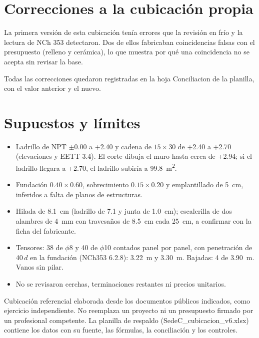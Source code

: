 \documentclass[letterpaper,10pt]{article}
\begin{document}
\section{Correcciones a la cubicación propia}
\begin{juntos}
La primera versión de esta cubicación tenía errores que la revisión en frío y la lectura de NCh 353 detectaron. Dos de ellos fabricaban coincidencias falsas con el presupuesto (relleno y cerámica), lo que muestra por qué una coincidencia no se acepta sin revisar la base.

Todas las correcciones quedaron registradas en la hoja Conciliacion de la planilla, con el valor anterior y el nuevo.
\end{juntos}

\section{Supuestos y límites}
\label{sec:supuestos}
\begin{itemize}[nosep]
\item Ladrillo de NPT $\pm0.00$ a +2.40 y cadena de $15\times30$ de +2.40 a +2.70 (elevaciones y EETT 3.4). El corte dibuja el muro hasta cerca de +2.94; si el ladrillo llegara a +2.70, el ladrillo subiría a \SI{99.8}{m^2}.
\item Fundación $0.40\times0.60$, sobrecimiento $0.15\times0.20$ y emplantillado de \SI{5}{cm}, inferidos a falta de planos de estructuras.
\item Hilada de \SI{8.1}{cm} (ladrillo de 7.1 y junta de \SI{1.0}{cm}); escalerilla de dos alambres de \SI{4}{mm} con travesaños de \SI{8.5}{cm} cada \SI{25}{cm}, a confirmar con la ficha del fabricante.
\item Tensores: 38 de $\phi$8 y 40 de $\phi$10 contados panel por panel, con penetración de 40\,$d$ en la fundación (NCh353 6.2.8): \SI{3.22}{m} y \SI{3.30}{m}. Bajadas: 4 de \SI{3.90}{m}. Vanos sin pilar.
\item No se revisaron cerchas, terminaciones restantes ni precios unitarios.
\end{itemize}
Cubicación referencial elaborada desde los documentos públicos indicados, como ejercicio independiente. No reemplaza un proyecto ni un presupuesto firmado por un profesional competente. La planilla de respaldo (SedeC\_cubicacion\_v6.xlsx) contiene los datos con su fuente, las fórmulas, la conciliación y los controles.
\end{document}
